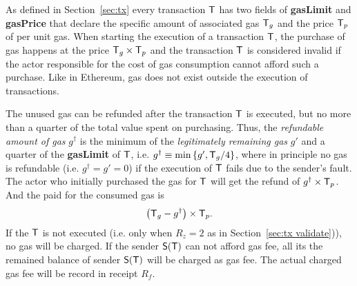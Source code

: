 As defined in Section~\ref{sec:tx} every transaction $\textsf{T}$ has two fields of {\bf gasLimit} and {\bf gasPrice} that declare the specific amount of associated gas $\textsf{T}_g$ and the price $\textsf{T}_p$ of per unit gas.
When starting the execution of a transaction $\textsf{T}$, the purchase of gas happens at the price $\textsf{T}_g \times \textsf{T}_p$ and the transaction $\textsf{T}$ is considered invalid if the actor responsible for the cost of gas consumption cannot afford such a purchase.
Like in Ethereum, gas does not exist outside the execution of transactions.


	The unused gas can be refunded after the transaction $\textsf{T}$ is executed, but no more than a quarter of the total value spent on purchasing. 
	Thus, the \emph{refundable amount of gas} $g^{\dagger}$ is the minimum of the \emph{legitimately remaining gas} $g'$ and a quarter of the \textbf{gasLimit} of $\textsf{T}$,
	i.e. $g^{\dagger}\equiv \min{\left \{{g', \textsf{T}_g/4} \right \}}$, 
	where in principle no gas is refundable (i.e. $g^{\dagger} = g' = 0$) if the execution of $\textsf{T}$ fails due to the sender's fault. 
	The actor who initially purchased the gas for $\textsf{T}$ will get the refund of $g^{\dagger}\times\textsf{T}_p$. And the \coinsign paid for the consumed gas is 
	\begin{align}
		\left(\textsf{T}_g-g^{\dagger}\right)\times \textsf{T}_p.
	\end{align}
	If the $\textsf{T}$ is not executed (i.e. only when $R_z=2$ as in Section~\ref{sec:tx validate})), no gas will be charged. If the sender $\mathsf{S}{\left({\textsf{T}} \right)}$ can not afford gas fee, all its the remained balance of sender $\mathsf{S}{\left({\textsf{T}} \right)}$ will be charged as gas fee. The actual charged gas fee will be record in receipt $R_f$. 

